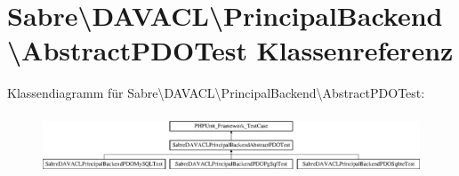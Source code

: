 \hypertarget{class_sabre_1_1_d_a_v_a_c_l_1_1_principal_backend_1_1_abstract_p_d_o_test}{}\section{Sabre\textbackslash{}D\+A\+V\+A\+CL\textbackslash{}Principal\+Backend\textbackslash{}Abstract\+P\+D\+O\+Test Klassenreferenz}
\label{class_sabre_1_1_d_a_v_a_c_l_1_1_principal_backend_1_1_abstract_p_d_o_test}
Klassendiagramm für Sabre\textbackslash{}D\+A\+V\+A\+CL\textbackslash{}Principal\+Backend\textbackslash{}Abstract\+P\+D\+O\+Test\+:\begin{figure}[H]
\begin{center}
\leavevmode
\includegraphics[height=1.783440cm]{class_sabre_1_1_d_a_v_a_c_l_1_1_principal_backend_1_1_abstract_p_d_o_test}
\end{center}
\end{figure}

